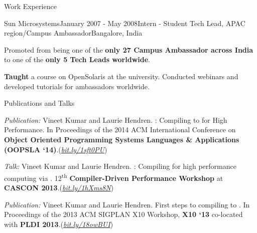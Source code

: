 \documentclass{resume} %
\begin{document}
\begin{rSection}{Work Experience}
\begin{rSubsection}{Sun Microsystems}{January 2007 - May 2008}{Intern - Student
Tech Lead, APAC region/Campus Ambassador}{Bangalore, India}
\item Promoted from being one of the \textbf{only 27 Campus Ambassador across India}
to one of the \textbf{only 5 Tech Leads worldwide}.  
\begin{lsubSubsection}
\item \textbf{Taught} a course on OpenSolaris at the university. Conducted
webinars and developed tutorials for ambassadors worldwide.
\end{lsubSubsection}
\end{rSubsection}
\end{rSection}


\begin{rSection}{Publications and Talks}
\smallskip
\begin{lSubsection}


\item \emph{Publication:} Vineet Kumar and Laurie Hendren. \mixten:
Compiling \matlab to \xten for High Performance. In Proceedings of the 2014
ACM International Conference on \textbf{Object Oriented Programming Systems
Languages \& Applications (OOPSLA `14)}.(\href{http://bit.ly/1sft0PU}{\em{bit.ly/1sft0PU}})

\item \emph{Talk:} Vineet Kumar and Laurie Hendren. \mixten: Compiling \matlab
for high performance computing via \xten. 12\textsuperscript{th}
\textbf{Compiler-Driven Performance Workshop} at \textbf{CASCON
2013}.(\href{http://webdocs.cs.ualberta.ca/~amaral/cascon/CDP13/#VinetKumar}{\em{bit.ly/1hXms8N}}) 

\item \emph{Publication:} Vineet Kumar and Laurie Hendren. First steps to
compiling \matlab to \xten. In Proceedings of the 2013 ACM SIGPLAN X10
Workshop, \textbf{X10 `13} co-located with \textbf{PLDI
2013}.(\href{http://www.sable.mcgill.ca/mclab/mix10/paper.pdf}{\em{bit.ly/18owBUI}})
\end{lSubsection}
\end{rSection}
\end{document}
